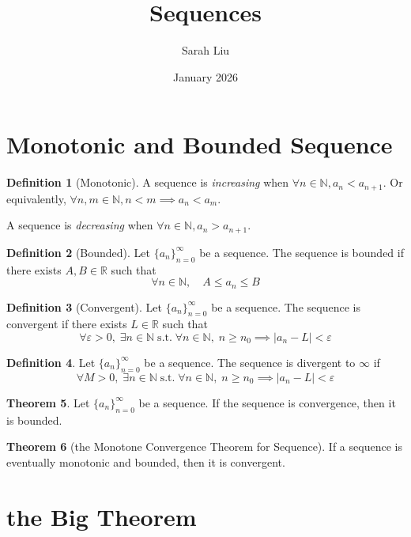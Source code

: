 \documentclass{article}
\title{Sequences}
\author{Sarah Liu}
\date{January 2026}
\theoremstyle{definition}
\newtheorem{theorem}{Theorem}[section]
\newtheorem{definition}[theorem]{Definition}
\theoremstyle{remark}
\begin{document}
\maketitle

\section{Monotonic and Bounded Sequence}

\begin{definition}[Monotonic]
    A sequence is \textit{increasing} when $\forall n\in\mathbb{N}, a_n<a_{n+1}$.
    Or equivalently, $\forall n,m\in\mathbb{N}, n<m\implies a_n<a_m$.

    A sequence is \textit{decreasing} when $\forall n\in\mathbb{N}, a_n>a_{n+1}$.
\end{definition}

\begin{definition}[Bounded]
    Let $\{a_n\}_{n=0}^{\infty}$ be a sequence.
    The sequence is bounded if there exists $A,B\in\mathbb{R}$ such that
    \[
    \forall n\in\mathbb{N},\quad A\leq a_n\leq B
    \]
\end{definition}

\begin{definition}[Convergent]
    Let $\{a_n\}_{n=0}^{\infty}$ be a sequence.
    The sequence is convergent if there exists $L\in\mathbb{R}$ such that
    \[
    \forall\varepsilon >0, \;\exists n\in\mathbb{N}\; \text{s.t.}\;\forall n\in\mathbb{N},\; n\geq n_0\implies|a_n-L|<\varepsilon
    \]
\end{definition}

\begin{definition}
    Let $\{a_n\}_{n=0}^{\infty}$ be a sequence.
    The sequence is divergent to $\infty$ if 
    \[
    \forall M >0, \;\exists n\in\mathbb{N}\; \text{s.t.}\;\forall n\in\mathbb{N},\; n\geq n_0\implies|a_n-L|<\varepsilon
    \]
\end{definition}

\begin{theorem}
    Let $\{a_n\}_{n=0}^{\infty}$ be a sequence.
    If the sequence is convergence, then it is bounded.
\end{theorem}

\begin{theorem}[the Monotone Convergence Theorem for Sequence]
    If a sequence is eventually monotonic and bounded, then it is convergent.
\end{theorem}

\section{the Big Theorem}
\end{document}
